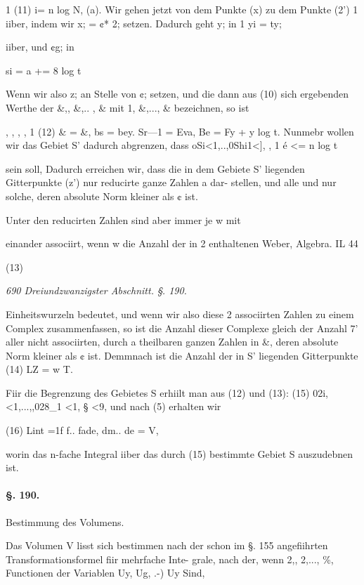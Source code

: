 \documentclass[12pt,a4paper]{article}
\theoremstyle{plain}
\theoremstyle{definition}
\begin{document}
1 (11) i= n log N, (a). Wir gehen jetzt von dem Punkte (x) zu dem Punkte (2') 1 iiber, indem wir x; = ¢* 2; setzen. Dadurch geht y; in 1 yi = ty;

iiber, und ¢g; in

si = a += 8 log t

Wenn wir also z; an Stelle von ¢; setzen, und die dann aus (10) sich ergebenden Werthe der \&,, \&,.. , \& mit 1, \&,..., \& bezeichnen, so ist

, , , , 1 (12) \& = \&, bs = bey. Sr---1 = Eva, Be = Fy + y log t. Nunmebr wollen wir das Gebiet S' dadurch abgrenzen, dass oSi<1,..,0Shi1<], , 1 é <= n log t

sein soll, Dadurch erreichen wir, dass die in dem Gebiete S' liegenden Gitterpunkte (z') nur reducirte ganze Zahlen a dar- stellen, und alle und nur solche, deren absolute Norm kleiner als ¢ ist.

Unter den reducirten Zahlen sind aber immer je w mit

einander associirt, wenn w die Anzahl der in 2 enthaltenen Weber, Algebra. IL 44

(13)

\vspace{0.5\baselineskip}\noindent\textit{690 Dreiundzwanzigster Abschnitt. §. 190.}\par

Einheitswurzeln bedeutet, und wenn wir also diese 2 associirten Zahlen zu einem Complex zusammenfassen, so ist die Anzahl dieser Complexe gleich der Anzahl 7' aller nicht associirten, durch a theilbaren ganzen Zahlen in \&, deren absolute Norm kleiner als ¢ ist. Demmnach ist die Anzahl der in S' liegenden Gitterpunkte (14) LZ = w T.

Fiir die Begrenzung des Gebietes S erhiilt man aus (12) und (13): (15) 02i,<1,...,,028\_1 <1, § <9, und nach (5) erhalten wir

(16) Lint =1f f.. fade, dm.. de = V,

worin das n-fache Integral iiber das durch (15) bestimmte Gebiet S auszudebnen ist.

\paragraph{§. 190.}

Bestimmung des Volumens.

Das Volumen V lisst sich bestimmen nach der schon im §. 155 angefiihrten Transformationsformel fiir mehrfache Inte- grale, nach der, wenn 2,, 2,..., \%, Functionen der Variablen Uy, Ug, .-) Uy Sind,
\end{document}
